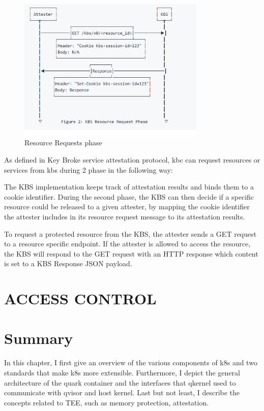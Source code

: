 \begin{figure}[H]
    \centering
    \includegraphics[width=0.8\textwidth]{images/resourcerequrie.PNG}
    \caption[Resource Requests phase]{Resource Requests phase}
    \label{fig:resourcerequrie}
\end{figure}
As defined in Key Broke service attestation protocol,  kbc can request resources or services from kbs during 2 phase in the following way:
\begin{displayquote}
    The KBS implementation keeps track of attestation results and binds them to a cookie identifier. During the second phase, the KBS can then decide if a specific resource could be released to a given attester, by mapping the cookie identifier the attester includes in 
    its resource request message to its attestation results.

    To request a protected resource from the KBS, the attester sends a GET request to a resource specific endpoint. If the attester is allowed to access the resource, the KBS will respond to the 
    GET request with an HTTP response which content is set to a KBS Response JSON payload.
\end{displayquote}




\section{ACCESS CONTROL}

\section{Summary}
In this chapter, I first give an overview of the various components of k8s and two standards that make k8s more extensible. Furthermore, I depict the general architecture of the quark container 
and the interfaces that qkernel used to communicate with qvisor and host kernel. Last but not least, I describe the concepts related to TEE, such as memory protection, attestation.

\cleardoublepage

